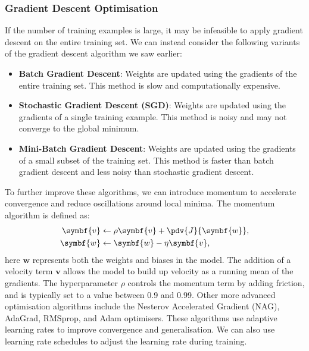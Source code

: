 \documentclass{article}
\begin{document}
\subsubsection{Gradient Descent Optimisation}
If the number of training examples is large, it may be infeasible to
apply gradient descent on the entire training set. We can instead
consider the following variants of the gradient descent algorithm we
saw earlier:
\begin{itemize}
    \item \textbf{Batch Gradient Descent}: Weights are updated using the
          gradients of the entire training set. This method is slow and
          computationally expensive.
    \item \textbf{Stochastic Gradient Descent (SGD)}: Weights are updated
          using the gradients of a single training example. This method
          is noisy and may not converge to the global minimum.
    \item \textbf{Mini-Batch Gradient Descent}: Weights are updated using
          the gradients of a small subset of the training set. This
          method is faster than batch gradient descent and less noisy
          than stochastic gradient descent.
\end{itemize}
To further improve these algorithms, we can introduce momentum to
accelerate convergence and reduce oscillations around local minima.
The momentum algorithm is defined as:
\begin{align*}
    \symbf{v} & \gets \rho \symbf{v} + \pdv{J}{\symbf{w}}, \\
    \symbf{w} & \gets \symbf{w} - \eta \symbf{v},
\end{align*}
here \(\symbf{w}\) represents both the weights and biases in the model.
The addition of a velocity term \(\symbf{v}\) allows the model to build
up velocity as a running mean of the gradients. The hyperparameter
\(\rho\) controls the momentum term by adding friction, and is typically
set to a value between 0.9 and 0.99. Other more advanced optimisation
algorithms include the Nesterov Accelerated Gradient (NAG), AdaGrad,
RMSprop, and Adam optimisers. These algorithms use adaptive learning
rates to improve convergence and generalisation. We can also use
learning rate schedules to adjust the learning rate during training.
\end{document}
